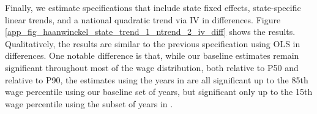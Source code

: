 \clearpage


Finally, we estimate specifications that include state fixed effects, state-specific linear trends, and a national quadratic trend via IV in differences. %
Figure \ref{app_fig_haanwinckel_state_trend_1_ntrend_2_iv_diff} shows the results. Qualitatively, the results are similar to the previous specification using OLS in differences. One notable difference is that, while our baseline estimates remain significant throughout most of the wage distribution, both relative to P50 and relative to P90, the estimates using the years in  are all significant up to the 85th wage percentile using our baseline set of years, but significant only up to the 15th wage percentile using the subset of years in .


